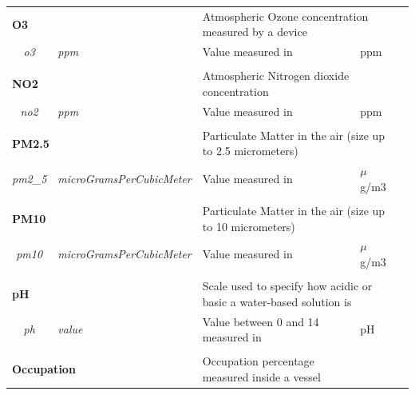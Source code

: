 \begin{landscape}
\begin{longtable}{cllll}
   \\[-0.85em]
   \multicolumn{2}{l}{\textbf{O3}}                                            & \multicolumn{2}{l}{Atmospheric Ozone concentration measured by a device}                &  \\
   \textit{o3}                           & \textit{ppm}                       & Value measured in                                      & ppm                            &  \\ [0.4em] \cline{1-4}
   \\[-0.85em]
   \multicolumn{2}{l}{\textbf{NO2}}                                           & \multicolumn{2}{l}{Atmospheric Nitrogen dioxide concentration}                          &  \\
   \textit{no2}                          & \textit{ppm}                       & Value measured in                                      & ppm                            &  \\ [0.4em] \cline{1-4}
   \\[-0.85em]
   \multicolumn{2}{l}{\textbf{PM2.5}}                                         & \multicolumn{2}{l}{Particulate Matter in the air (size up to 2.5 micrometers)}          &  \\
   \textit{pm2\_5}                       & \textit{microGramsPerCubicMeter}   & Value measured in                                      & $\mu$g/m3                      &  \\ [0.4em] \cline{1-4}
   \\[-0.85em]
   \multicolumn{2}{l}{\textbf{PM10}}                                          & \multicolumn{2}{l}{Particulate Matter in the air (size up to 10 micrometers)}           &  \\
   \textit{pm10}                         & \textit{microGramsPerCubicMeter}   & Value measured in                                      & $\mu$g/m3                      &  \\ [0.4em] \cline{1-4}
   \\[-0.85em]
   \multicolumn{2}{l}{\textbf{pH}}                                            & \multicolumn{2}{l}{Scale used to specify how acidic or basic a water-based solution is} &  \\
   \textit{ph}                           & \textit{value}                     & Value between 0 and 14 measured in                     & pH                             &  \\ [0.4em] \cline{1-4}
   \\[-0.85em]
   \multicolumn{2}{l}{\textbf{Occupation}}                                    & Occupation percentage measured inside a vessel         &                                &  \\

\end{longtable}
\end{landscape}
